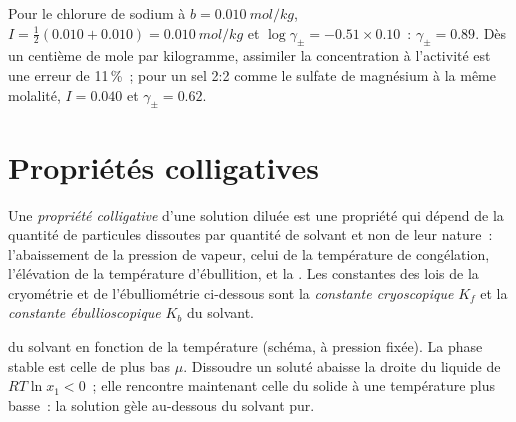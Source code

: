 \begin{example}\label{ex:b2:chemical-potential:dh}
Pour le chlorure de sodium à $b = \qty{0.010}{mol/kg}$, $I = \frac12(0.010 + 0.010)
= \qty{0.010}{mol/kg}$ et $\log\gamma_\pm = -0.51 \times 0.10$~: $\gamma_\pm
= 0.89$. Dès un centième de mole par kilogramme, assimiler la
concentration à l'activité est une erreur de 11\,\%~; pour un sel 2:2 comme le
sulfate de magnésium à la même molalité, $I = 0.040$ et $\gamma_\pm = 0.62$.
\end{example}

\section{Propriétés colligatives}

\begin{definition}\label{def:b2:chemical-potential:colligative}
Une \emph{propriété colligative} d'une solution
diluée est une propriété qui dépend de la quantité de particules dissoutes par
quantité de solvant et non de leur nature~: l'abaissement de la pression de
vapeur, celui de la température de congélation, l'élévation de la température d'ébullition, et la
. Les constantes des lois de la cryométrie et de l'ébulliométrie
ci-dessous sont la \emph{constante cryoscopique} $K_f$
et la \emph{constante ébullioscopique} $K_b$ du
solvant.
\end{definition}

\begin{omfigure}

{\small {} du solvant en fonction de la température (schéma,
à pression fixée). La phase stable est celle de plus bas $\mu$. Dissoudre un
soluté abaisse la droite du liquide de $RT\ln x_1 < 0$~; elle rencontre maintenant celle du
solide à une température plus basse~: la solution gèle au-dessous du solvant pur.}
\end{omfigure}

